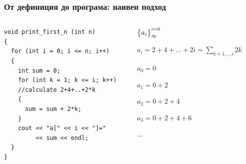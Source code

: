 \documentclass{beamer}
\begin{document}
\begin{frame}[fragile]
\frametitle{От дефиниция до програма: наивен подход}


\begin{columns}[t]
  \begin{column}{0.6\textwidth}

\begin{lstlisting}
void print_first_n (int n)
{
  for (int i = 0; i <= n; i++)
  {
    int sum = 0;
    for (int k = 1; k <= i; k++)
    //calculate 2+4+..+2*k
    {
      sum = sum + 2*k;
    }
    cout << "a[" << i << "]="
         << sum << endl;
  }
}
\end{lstlisting}


  \end{column}
  \begin{column}{0.4\textwidth}
\begin{flushleft}

  $\big{\{}a_i\big{\}}_\infty^{i=0}$

  \vspace{10px}

  $a_i = 2 + 4 + ... + 2i = \sum\limits_{k=1,..,i}2k$


  \vspace{30px}

  $a_0 = 0$

  $a_1 = 0 + 2$

  $a_2 = 0 + 2 + 4$

  $a_3 = 0 + 2 + 4 + 6$

  ...


\end{flushleft}
  \end{column}
\end{columns}

\end{frame}
\end{document}
